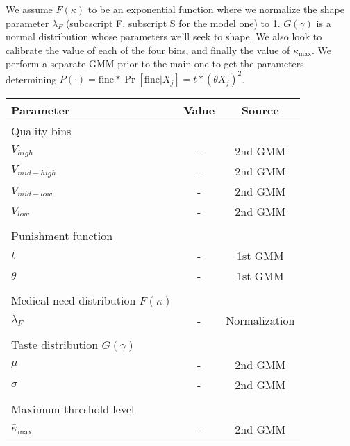 \documentclass[11pt]{article}
\begin{document}
We assume $F(\kappa)$ to be an exponential function where we normalize the shape parameter $\lambda_F$ (subcscript F, subscript S for the model one) to 1. $G(\gamma)$ is a normal distribution whose parameters we'll seek to shape. We also look to calibrate the value of each of the four bins, and finally the value of $\kappa_{\max}$. We perform a separate GMM prior to the main one to get the parameters determining $P(\cdot) = \text{fine} * \operatorname{Pr}[\text{fine} | X_j] = t * (\theta X_j)^2$.

\begin{table}[h]
\centering
\begin{tabular}{lcc}
    \toprule
    Parameter & Value & Source \\
    \midrule
    Quality bins && \\
        \hspace{1em}$V_{high}$  &   - & 2nd GMM \\
        \hspace{1em}$V_{mid-high}$ & - & 2nd GMM\\
        \hspace{1em}$V_{mid-low}$ & -& 2nd GMM \\
        \hspace{1em}$V_{low}$   & - & 2nd GMM\\
        \\
    Punishment function && \\
        \hspace{1em}$t$ & - & 1st GMM\\
        \hspace{1em}$\theta$ & - & 1st GMM\\
        \\
    Medical need distribution $F(\kappa)$ && \\
        \hspace{1em}$\lambda_F$ & - & Normalization\\
        \\
    Taste distribution $G(\gamma)$ \\
        \hspace{1em}$\mu$ & - & 2nd GMM\\
        \hspace{1em}$\sigma$ & - & 2nd GMM\\
        \\
    Maximum threshold level && \\
        \hspace{1em}$\bar{\kappa}_{\max}$ & - & 2nd GMM\\

\end{tabular}
\end{table}
\end{document}
